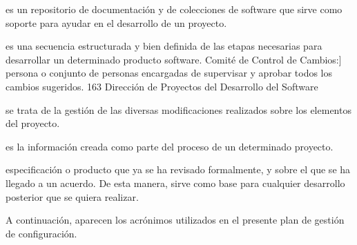 \begin{description}[style=multiline, leftmargin=4cm]
  \item[Bibliotecas software:] es un repositorio de documentación y de colecciones de software que sirve como soporte
  para ayudar en el desarrollo de un proyecto.
  \item[Ciclo de vida:] es una secuencia estructurada y bien definida de las etapas necesarias para desarrollar
  un determinado producto software. Comité de Control de Cambios:] persona o conjunto
  de personas encargadas de supervisar y aprobar todos los cambios sugeridos.
  163
  Dirección de Proyectos del Desarrollo del Software
  \item[Control de versiones:] se trata de la gestión de las diversas modificaciones realizados sobre los elementos del
  proyecto.
  \item[Elementos de configuración:] es la información creada como parte del proceso de un determinado proyecto.
  \item[Líneas base:] especificación o producto que ya se ha revisado formalmente, y sobre el que se ha
  llegado a un acuerdo. De esta manera, sirve como base para cualquier desarrollo
  posterior que se quiera realizar.
\end{description}

\par A continuación, aparecen los acrónimos utilizados en el presente plan de gestión de configuración.

